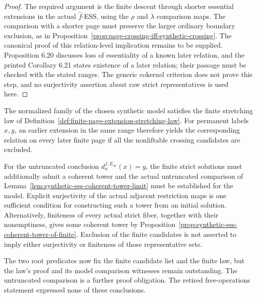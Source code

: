 \begin{proof}
  The required argument is the finite descent through shorter essential
  extensions in the actual $\widehat f$-ESS, using the $\rho$ and
  $\lambda$ comparison maps.  The comparison with a shorter page must
  preserve the larger ordinary boundary exclusion, as in
  Proposition~\ref{prop:page-crossing-iff-synthetic-crossing}.
  The canonical proof of this relation-level implication remains to be
  supplied.  Proposition 6.20 discusses loss of essentiality of a known
  later relation, and the printed Corollary 6.21 states existence of a
  later relation; their passage must be checked with the stated ranges.
  The generic cokernel criterion does not prove this step, and no
  surjectivity assertion about raw strict representatives is used here.
\end{proof}

\begin{corollary}
  \label{cor:page-extension-stretch}
  \notready
  The normalized family of the chosen synthetic model satisfies the finite
  stretching law of
  Definition~\ref{def:finite-page-extension-stretching-law}.
  For permanent labels $x,y$, an earlier extension in the same range
  therefore yields the corresponding relation on every later finite page
  if all the nonliftable crossing candidates are excluded.

  For the untruncated conclusion $d_n^{f,E_\infty}(x)=y$, the finite
  strict solutions must additionally admit a coherent tower and the
  actual untruncated comparison of
  Lemma~\ref{lem:synthetic-ess-coherent-tower-limit} must be established
  for the model.  Explicit surjectivity of the actual adjacent restriction
  maps is one sufficient condition for constructing such a tower from an
  initial solution.  Alternatively, finiteness of every actual strict
  fiber, together with their nonemptiness, gives some coherent tower by
  Proposition~\ref{prop:synthetic-ess-coherent-tower-of-finite}.
  Exclusion of the finite candidates is not asserted to imply either
  surjectivity or finiteness of those representative sets.

  The two root predicates now fix the finite candidate list and the
  finite law, but the law's proof and its model comparison witnesses
  remain outstanding.  The untruncated comparison is a further proof
  obligation.  The retired free-operations statement expressed none of
  these conclusions.
\end{corollary}

